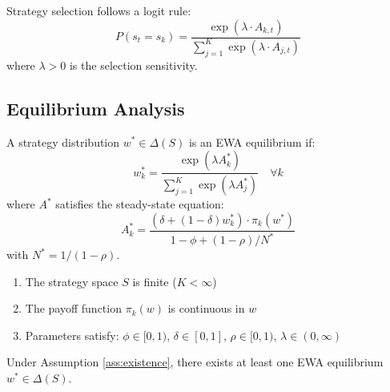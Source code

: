Strategy selection follows a logit rule:
\begin{equation}
P(s_{t} = s_k) = \frac{\exp(\lambda \cdot A_{k,t})}{\sum_{j=1}^K \exp(\lambda \cdot A_{j,t})}
\end{equation}
where $\lambda > 0$ is the selection sensitivity.

\subsection{Equilibrium Analysis}

\begin{definition}
A strategy distribution $w^* \in \Delta(S)$ is an EWA equilibrium if:
\begin{equation}
w^*_k = \frac{\exp(\lambda A^*_k)}{\sum_{j=1}^K \exp(\lambda A^*_j)} \quad \forall k
\end{equation}
where $A^*$ satisfies the steady-state equation:
\begin{equation}
A^*_k = \frac{(\delta + (1-\delta) w^*_k) \cdot \pi_k(w^*)}{1 - \phi + (1-\rho)/N^*}
\end{equation}
with $N^* = 1/(1-\rho)$.
\end{definition}

\begin{assumption}
\label{ass:existence}
\begin{enumerate}
    \item[A1.] The strategy space $S$ is finite ($K < \infty$)
    \item[A2.] The payoff function $\pi_k(w)$ is continuous in $w$
    \item[A3.] Parameters satisfy: $\phi \in [0,1)$, $\delta \in [0,1]$, $\rho \in [0,1)$, $\lambda \in (0,\infty)$
\end{enumerate}
\end{assumption}

\begin{proposition}
\label{prop:existence}
Under Assumption \ref{ass:existence}, there exists at least one EWA equilibrium $w^* \in \Delta(S)$.
\end{proposition}

